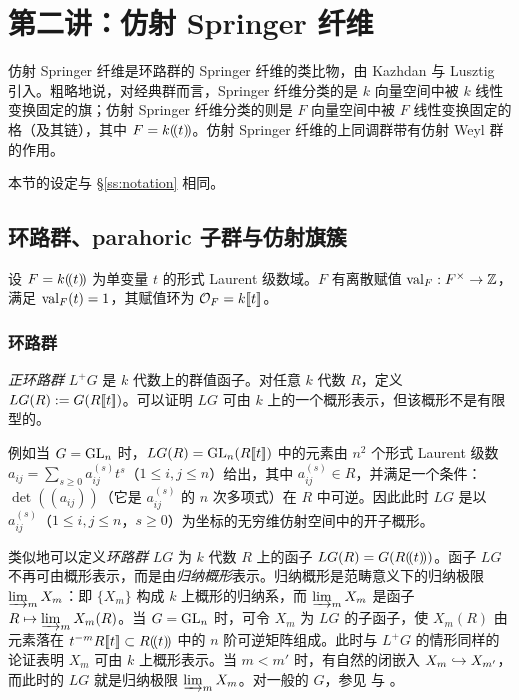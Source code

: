 \section{第二讲：仿射 Springer 纤维}\label{s:ASF}

仿射 Springer 纤维是环路群的 Springer 纤维的类比物，由 Kazhdan 与 Lusztig \cite{KL} 引入。粗略地说，对经典群而言，Springer 纤维分类的是 $k$ 向量空间中被 $k$ 线性变换固定的旗；仿射 Springer 纤维分类的则是 $F$ 向量空间中被 $F$ 线性变换固定的格（及其链），其中 $F=k(\!(t)\!)$。仿射 Springer 纤维的上同调群带有仿射 Weyl 群的作用。

本节的设定与 \S\ref{ss:notation} 相同。

\subsection{环路群、parahoric 子群与仿射旗簇}
设 $F=k(\!(t)\!)$ 为单变量 $t$ 的形式 Laurent 级数域。$F$ 有离散赋值 $\textup{val}_{F}:F^{\times}\to\mathbb{Z}$，满足 $\textup{val}_{F}(t)=1$，其赋值环为 $\mathcal{O}_{F}=k[\![t]\!]$。

\subsubsection{环路群} {\em 正环路群} $L^{+}G$ 是 $k$ 代数上的群值函子。对任意 $k$ 代数 $R$，定义 $LG(R):=G(R[\![t]\!])$。可以证明 $LG$ 可由 $k$ 上的一个概形表示，但该概形不是有限型的。

例如当 $G=\textup{GL}_{n}$ 时，$LG(R)=\textup{GL}_{n}(R[\![t]\!])$ 中的元素由 $n^{2}$ 个形式 Laurent 级数 $a_{ij}=\sum_{s\geq 0}a^{(s)}_{ij}t^{s}$（$1\leq i,j\leq n$）给出，其中 $a^{(s)}_{ij}\in R$，并满足一个条件：$\det((a_{ij}))$（它是 $a^{(s)}_{ij}$ 的 $n$ 次多项式）在 $R$ 中可逆。因此此时 $LG$ 是以 $a^{(s)}_{ij}$（$1\leq i,j\leq n$，$s\geq 0$）为坐标的无穷维仿射空间中的开子概形。

类似地可以定义{\em 环路群} $LG$ 为 $k$ 代数 $R$ 上的函子 $LG(R)=G(R(\!(t)\!))$。函子 $LG$ 不再可由概形表示，而是由{\em 归纳概形}表示。归纳概形是范畴意义下的归纳极限 $\varinjlim_{m} X_{m}$：即 $\{X_{m}\}$ 构成 $k$ 上概形的归纳系，而 $\varinjlim_{m} X_{m}$ 是函子 $R\mapsto \varinjlim_{m} X_{m}(R)$。当 $G=\textup{GL}_{n}$ 时，可令 $X_{m}$ 为 $LG$ 的子函子，使 $X_{m}(R)$ 由元素落在 $t^{-m}R[\![t]\!]\subset R(\!(t)\!)$ 中的 $n$ 阶可逆矩阵组成。此时与 $L^{+}G$ 的情形同样的论证表明 $X_{m}$ 可由 $k$ 上概形表示。当 $m<m'$ 时，有自然的闭嵌入 $X_{m}\hookrightarrow X_{m'}$，而此时的 $LG$ 就是归纳极限 $\varinjlim_{m}X_{m}$。对一般的 $G$，参见 \cite[\S1]{BL} 与 \cite[\S2]{Faltings}。

